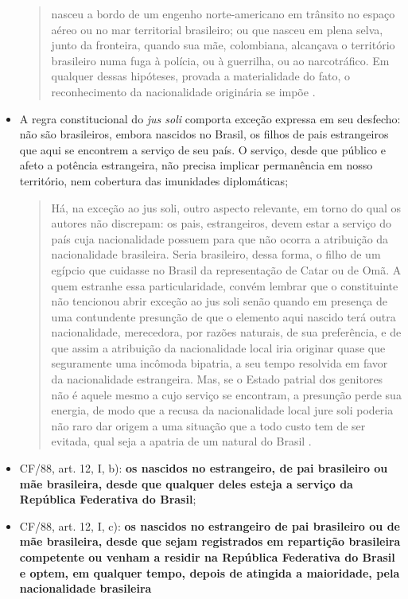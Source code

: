 \documentclass{article}
\begin{document}
\begin{itemize}
\begin{quote}
nasceu a bordo de um engenho norte-americano em trânsito no espaço aéreo ou no mar territorial brasileiro; ou que nasceu em plena selva, junto da fronteira, quando sua mãe, colombiana, alcançava o território brasileiro numa fuga à polícia, ou à guerrilha, ou ao narcotráfico. Em qualquer dessas hipóteses, provada a materialidade do fato, o reconhecimento da nacionalidade originária se impõe \cite[pp.~81-82]{rezek_direito_2024}.
    \end{quote}
    \item A regra constitucional do \textit{jus soli} comporta exceção expressa em seu desfecho: não são brasileiros, embora nascidos no Brasil, os filhos de pais estrangeiros que aqui se encontrem a serviço de seu país. O serviço, desde que público e afeto a potência estrangeira, não precisa implicar permanência em nosso território, nem cobertura das imunidades diplomáticas;
    \begin{quote}
        Há, na exceção ao jus soli, outro aspecto relevante, em torno do qual os autores não discrepam: os pais, estrangeiros, devem estar a serviço do país cuja nacionalidade possuem para que não ocorra a atribuição da nacionalidade brasileira. Seria brasileiro, dessa forma, o filho de um egípcio que cuidasse no Brasil da representação de Catar ou de Omã. A quem estranhe essa particularidade, convém lembrar que o constituinte não tencionou abrir exceção ao jus soli senão quando em presença de uma contundente presunção de que o elemento aqui nascido terá outra na­cionalidade, merecedora, por razões naturais, de sua preferência, e de que assim a atribuição da nacionalidade local iria originar quase que seguramente uma incômoda bipatria, a seu tempo resolvida em favor da nacionalidade estrangeira. Mas, se o Estado patrial dos genitores não é aquele mesmo a cujo serviço se encontram, a presunção perde sua energia, de modo que a recusa da nacionalidade local jure soli poderia não raro dar origem a uma situação que a todo custo tem de ser evitada, qual seja a apatria de um natural do Brasil  \cite[p.~82]{rezek_direito_2024}.
    \end{quote}
    \item CF/88, art. 12, I, b): \textbf{os nascidos no estrangeiro, de pai brasileiro ou mãe brasileira, desde que qualquer deles esteja a serviço da República Federativa do Brasil};
    \item CF/88, art. 12, I, c): \textbf{os nascidos no estrangeiro de pai brasileiro ou de mãe brasileira, desde que sejam registrados em repartição brasileira competente ou venham a residir na República Federativa do Brasil e optem, em qualquer tempo, depois de atingida a maioridade, pela nacionalidade brasileira}
\end{itemize}
\end{document}
